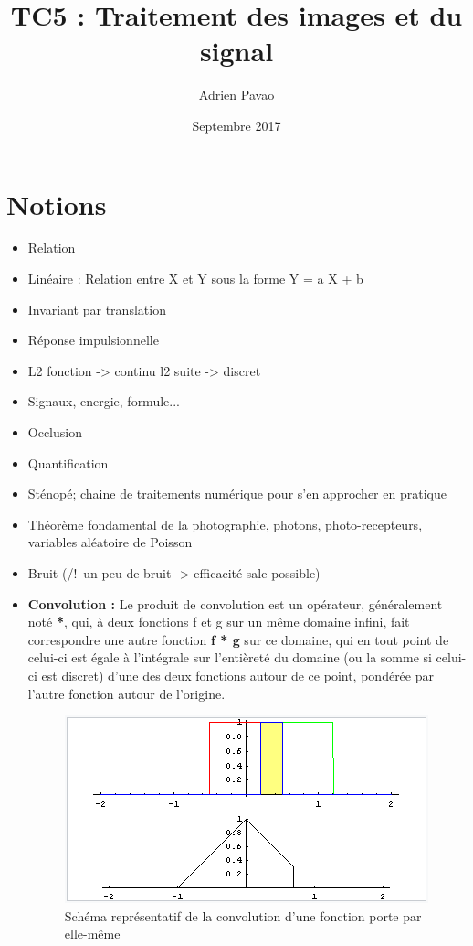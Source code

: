 \documentclass{article}
\title{TC5 : Traitement des images et du signal}
\author{Adrien Pavao}
\date{Septembre 2017}
\begin{document}
\maketitle

\tableofcontents

\section{Notions}

\begin{itemize}

\item Relation
\item Linéaire : Relation entre X et Y sous la forme Y = a X + b
\item Invariant par translation
\item Réponse impulsionnelle
\item 
L2 fonction -> continu
l2 suite -> discret
\item Signaux, energie, formule...
\item Occlusion
\item Quantification
\item Sténopé; chaine de traitements numérique pour s'en approcher en pratique
\item Théorème fondamental de la photographie, photons, photo-recepteurs, variables aléatoire de Poisson
\item Bruit (/!\ un peu de bruit -> efficacité sale possible)


\item \textbf{Convolution : } Le produit de convolution est un opérateur, généralement noté \textbf{*}, qui, à deux fonctions f et g sur un même domaine infini, fait correspondre une autre fonction \textbf{f * g} sur ce domaine, qui en tout point de celui-ci est égale à l'intégrale sur l'entièreté du domaine (ou la somme si celui-ci est discret) d'une des deux fonctions autour de ce point, pondérée par l'autre fonction autour de l'origine.

\begin{figure}[H]
   \caption{Schéma représentatif de la convolution d'une fonction porte par elle-même}
    \begin{center} \includegraphics[scale=0.7]{convolution.png} \end{center}
\end{figure}


\end{itemize}
\end{document}
